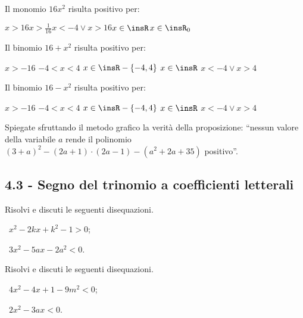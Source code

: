 \begin{esercizio}
\label{ese:4.23}
Il monomio $16x^2$ risulta positivo per:

\boxA\quad $x>16$\qquad \boxB\quad $x>\frac 1{16}$\qquad\boxC\quad $x<-4\vee x>16$\qquad\boxD\quad $x\in \insR$\qquad\boxE\quad $x\in \insR_0$

\end{esercizio}

\begin{esercizio}
\label{ese:4.24}
Il binomio $16+x^2$ risulta positivo per:

\boxA\; $x>-16$\quad \boxB\; $-4<x<4$ \quad\boxC\; $x\in \insR-\{-4,4\}$ \quad\boxD\; $x\in \insR$ \quad\boxE\; $x<-4\vee x>4$
\end{esercizio}

\begin{esercizio}
\label{ese:4.25}
Il binomio $16-x^2$ risulta positivo per:

\boxA\; $x>-16$\quad \boxB\; $-4<x<4$ \quad\boxC\; $x\in \insR-\{-4,4\}$ \quad\boxD\; $x\in \insR$ \quad\boxE\; $x<-4\vee x>4$
\end{esercizio}

\begin{esercizio}
 \label{ese:4.26}
Spiegate sfruttando il metodo grafico la verità della proposizione: “nessun valore della variabile $a$ rende il polinomio $(3+a)^2-(2a+1)\cdot (2a-1)-(a^2+2a+35)$ positivo”.
\end{esercizio}

\subsection*{4.3 - Segno del trinomio a coefficienti letterali}

\begin{esercizio}[\Ast]
 \label{ese:4.27}
Risolvi e discuti le seguenti disequazioni.
\begin{multicols}{2}
 \begin{enumeratea}
 \item~$x^2-2{kx}+k^2-1>0$;
 \item~$3x^2-5{ax}-2a^2<0$.
 \end{enumeratea}
 \end{multicols}
\end{esercizio}

\begin{esercizio}[\Ast]
 \label{ese:4.28}
Risolvi e discuti le seguenti disequazioni.
\begin{multicols}{2}
 \begin{enumeratea}
 \item~$4x^2-4x+1-9m^2<0$;
 \item~$2x^2-3{ax}<0$.
 \end{enumeratea}
 \end{multicols}
\end{esercizio}


